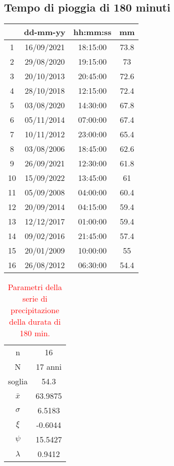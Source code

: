 \subsection{Tempo di pioggia di 180 minuti}
\begin{table}[H] \centering
    \begin{tabular}{cccc}
    \toprule
       & dd-mm-yy   & hh:mm:ss & mm \\
    \midrule
    1  & 16/09/2021 & 18:15:00 & 73.8 \\
    2  & 29/08/2020 & 19:15:00 & 73   \\
    3  & 20/10/2013 & 20:45:00 & 72.6 \\
    4  & 28/10/2018 & 12:15:00 & 72.4 \\
    5  & 03/08/2020 & 14:30:00 & 67.8 \\
    6  & 05/11/2014 & 07:00:00 & 67.4 \\
    7  & 10/11/2012 & 23:00:00 & 65.4 \\
    8  & 03/08/2006 & 18:45:00 & 62.6 \\
    9  & 26/09/2021 & 12:30:00 & 61.8 \\
    10 & 15/09/2022 & 13:45:00 & 61   \\
    11 & 05/09/2008 & 04:00:00 & 60.4 \\
    12 & 20/09/2014 & 04:15:00 & 59.4 \\
    13 & 12/12/2017 & 01:00:00 & 59.4 \\
    14 & 09/02/2016 & 21:45:00 & 57.4 \\
    15 & 20/01/2009 & 10:00:00 & 55   \\
    16 & 26/08/2012 & 06:30:00 & 54.4 \\
    \bottomrule
    \end{tabular}
    \end{table}

    \begin{table}[H] \centering
        \caption{\textcolor{red}{Parametri della serie di precipitazione della durata di 180 min.}}
        \begin{tabular}{cc}
            \toprule
        n        &    16     \\
        N        & 17 anni \\
        soglia   &     54.3    \\
        $\bar{x}$ &  63.9875\\
        $\sigma$ &   6.5183  \\
        $\xi$    &    -0.6044  \\
        $\psi$      &    15.5427 \\
        $\lambda$   &    0.9412\\
    \bottomrule    
    \end{tabular}
        \end{table}

